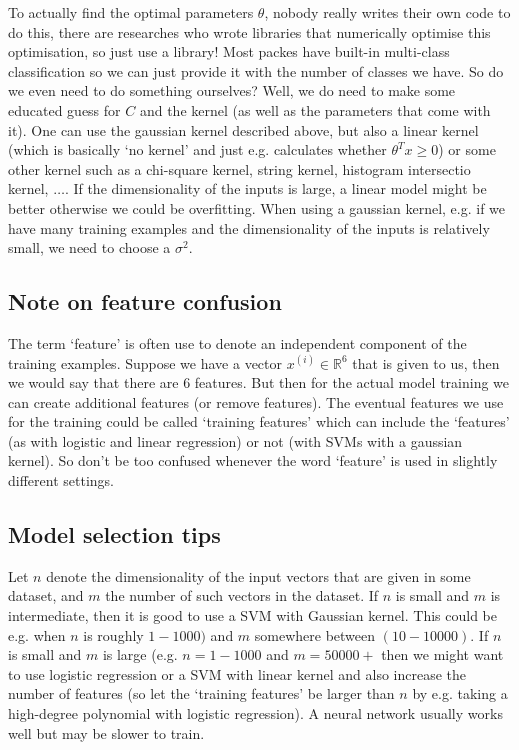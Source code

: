 \documentclass[a4paper, 10pt,hidelinks]{article}
\newcommand{\ind}[1]{^{(#1)}}
\begin{document}
To actually find the optimal parameters $\theta$, nobody really writes their own code to do this, there are researches who wrote libraries that numerically optimise this optimisation, so just use a library! Most packes have built-in multi-class classification so we can just provide it with the number of classes we have. So do we even need to do something ourselves? Well, we do need to make some educated guess for $C$ and the kernel (as well as the parameters that come with it). One can use the gaussian kernel described above, but also a linear kernel (which is basically `no kernel' and just e.g. calculates whether $\theta^T x \geq 0$) or some other kernel such as a chi-square kernel, string kernel, histogram intersectio kernel, $\ldots$. If the dimensionality of the inputs is large, a linear model might be better otherwise we could be overfitting. When using a gaussian kernel, e.g. if we have many training examples and the dimensionality of the inputs is relatively small,  we need to choose a $\sigma^2$. 

\subsection{Note on feature confusion}
The term `feature' is often use to denote an independent component of the training examples. Suppose we have a vector $x\ind{i} \in \mathbb{R}^6$ that is given to us, then we would say that there are 6 features. But then for the actual model training we can create additional features (or remove features). The eventual features we use for the training could be called `training features' which can include the `features' (as with logistic and linear regression) or not (with SVMs with a gaussian kernel). So don't be too confused whenever the word `feature' is used in slightly different settings. 

\subsection{Model selection tips}
Let $n$ denote the dimensionality of the input vectors that are given in some dataset, and $m$ the number of such vectors in the dataset. If $n$ is small and $m$ is intermediate, then it is good to use a SVM with Gaussian kernel. This could be e.g. when $n$ is roughly  $1 -  1000)$ and $m$ somewhere  between $(10 - 10000)$. If $n$ is small and $m$ is large (e.g. $n = 1 - 1000$ and $m = 50000 +$ then we might want to use logistic regression or a SVM with linear kernel and also increase the number of features (so let the `training features' be larger than $n$ by e.g. taking a high-degree polynomial with logistic regression). A neural network usually works well but may be slower to train.
\end{document}
